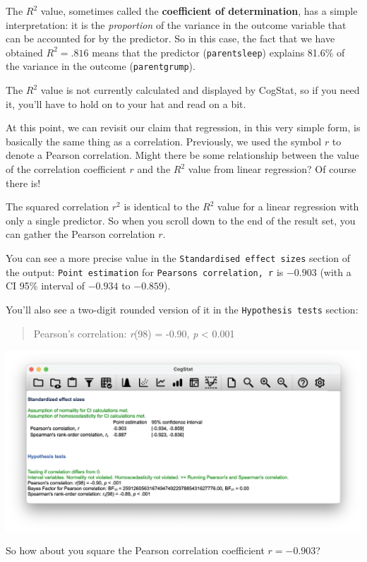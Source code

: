 \documentclass[
  11pt,
  a4paper,
  twoside,symmetric,openright]{book}
\theoremstyle{break}
\theoremstyle{break}
\begin{document}
The \(R^2\) value, sometimes called the \textbf{coefficient of determination}, has a simple interpretation: it is the \emph{proportion} of the variance in the outcome variable that can be accounted for by the predictor. So in this case, the fact that we have obtained \(R^2 = .816\) means that the predictor (\texttt{parentsleep}) explains 81.6\% of the variance in the outcome (\texttt{parentgrump}).

The \(R^2\) value is not currently calculated and displayed by CogStat, so if you need it, you'll have to hold on to your hat and read on a bit.

At this point, we can revisit our claim that regression, in this very simple form, is basically the same thing as a correlation. Previously, we used the symbol \(r\) to denote a Pearson correlation. Might there be some relationship between the value of the correlation coefficient \(r\) and the \(R^2\) value from linear regression? Of course there is!

The squared correlation \(r^2\) is identical to the \(R^2\) value for a linear regression with only a single predictor. So when you scroll down to the end of the result set, you can gather the Pearson correlation \(r\).

You can see a more precise value in the \texttt{Standardised\ effect\ sizes} section of the output: \texttt{Point\ estimation} for \texttt{Pearson\textquotesingle{}s\ correlation,\ r} is \(-0.903\) (with a CI 95\% interval of \(-0.934\) to \(-0.859\)).

You'll also see a two-digit rounded version of it in the \texttt{Hypothesis\ tests} section:

\begin{quote}
Pearson's correlation: \emph{r}(98) = -0.90, \emph{p} \textless{} 0.001
\end{quote}

\begin{center}\includegraphics[width=0.6\linewidth]{resources/image/cogstatrvsrsqrd} \end{center}

So how about you square the Pearson correlation coefficient \(r = -0.903\)?
\end{document}

